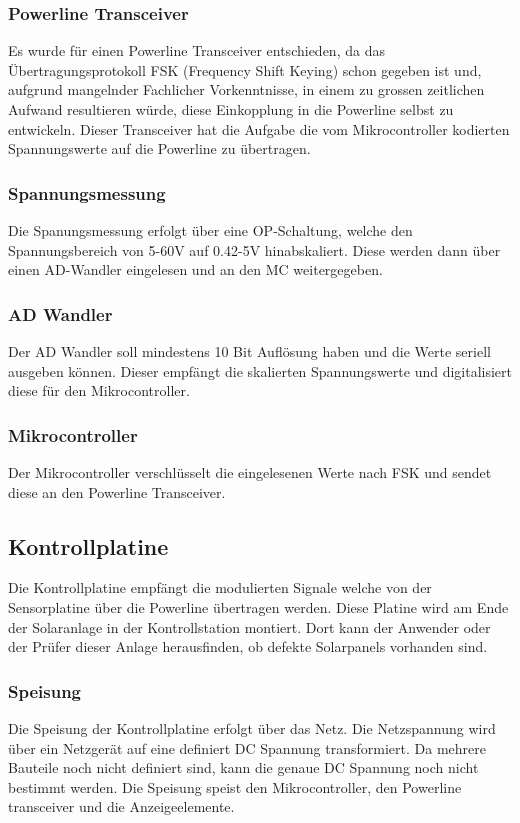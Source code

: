 \newpage
\subsubsection{Powerline Transceiver}

Es wurde für einen Powerline Transceiver entschieden, da das Übertragungsprotokoll FSK (Frequency Shift Keying) schon gegeben ist und, aufgrund mangelnder Fachlicher Vorkenntnisse, in einem zu grossen zeitlichen Aufwand resultieren würde, diese Einkopplung in die Powerline selbst zu entwickeln. 
Dieser Transceiver hat die Aufgabe die vom Mikrocontroller kodierten Spannungswerte auf die Powerline zu übertragen.

\subsubsection{Spannungsmessung}

Die Spanungsmessung erfolgt über eine OP-Schaltung, welche den Spannungsbereich von 5-60V auf 0.42-5V hinabskaliert. Diese werden dann über einen AD-Wandler eingelesen und an den MC weitergegeben.

\subsubsection{AD Wandler}

Der AD Wandler soll mindestens 10 Bit Auflösung haben und die Werte seriell ausgeben können. Dieser empfängt die skalierten Spannungswerte und digitalisiert diese für den Mikrocontroller.

\subsubsection{Mikrocontroller}

Der Mikrocontroller verschlüsselt die eingelesenen Werte nach FSK und sendet diese an den Powerline Transceiver.

\subsection{Kontrollplatine}

Die Kontrollplatine empfängt die modulierten Signale welche von der Sensorplatine über die Powerline übertragen werden. Diese Platine wird am Ende der Solaranlage in der Kontrollstation montiert. Dort kann der Anwender oder der Prüfer dieser Anlage herausfinden, ob defekte Solarpanels vorhanden sind.

\subsubsection{Speisung}
Die Speisung der Kontrollplatine erfolgt über das Netz. Die Netzspannung wird über ein Netzgerät auf eine definiert DC Spannung transformiert. 
Da mehrere Bauteile noch nicht definiert sind, kann die genaue DC Spannung noch nicht bestimmt werden. Die Speisung speist den Mikrocontroller, den Powerline transceiver und die Anzeigeelemente.

